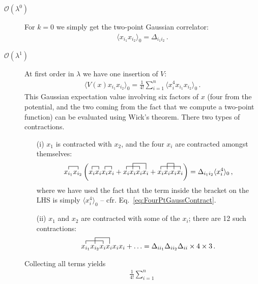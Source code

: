 \documentclass[notes.tex]{subfiles}
\begin{document}
\begin{description}
\item[$\mathcal{O}(\lambda^0)$] For $k=0$ we simply get the two-point Gaussian
  correlator: 
  \begin{align}
    \langle x_{i_1} x_{i_2} \rangle_0 = \Delta_{i_1 i_2}\, .
  \end{align}
\item[$\mathcal{O}(\lambda^1)$] At first order in $\lambda$ we have one insertion
  of $V$:
  \begin{align}
    \langle V(x) x_{i_1} x_{i_2} \rangle_0 = \frac{1}{4!} \sum_{i=1}^n
    \langle x_i^4 x_{i_1} x_{i_2} \rangle_0\, .
  \end{align}
  This Gaussian expectation value involving six factors of $x$ (four
  from the potential, and the two coming from the fact that we compute
  a two-point function) can be evaluated using Wick's
  theorem. There two types of contractions.
  \begin{itemize}
  \item [(i)] $x_1$ is contracted with $x_2$, and the four $x_i$ are
    contracted amongst themselves:
    \begin{align}
      \contraction{}{x_{i_1}}{}{x_{i_2}}
      x_{i_1} x_{i_2} 
      \left(
      \contraction{}{x_{i}}{}{x_{i}}
      \contraction{x_{i} x_{i}}{x_{i}}{}{x_{i}}
      x_{i} x_{i} x_{i} x_{i} +
      \contraction{}{x_{i}}{x_{i}}{x_{i}}
      \contraction[2ex]{x_{i}}{x_{i}}{ x_{i}}{x_{i}}
      x_{i} x_{i} x_{i} x_{i} +
      \contraction{}{x_{i}}{x_{i}x_{i}}{x_{i}}
      \contraction[2ex]{x_{i}}{x_{i}}{}{x_{i}}
      x_{i} x_{i} x_{i} x_{i} 
      \right) = \Delta_{i_1 i_2} \langle x_i^4\rangle_0
      \, ,
    \end{align}
    where we have used the fact that the term inside the bracket on
    the LHS is simply $\langle x_i^4\rangle_0$ --
    cfr. Eq.~\ref{eq:FourPtGaussContract}.
  \item [(ii)] $x_1$ and $x_2$ are contracted with some of the $x_i$;
    there are 12 such contractions:
    \begin{align}
      \contraction{}{x_{i_1}}{x_{i_2}}{x_{i}}
      \contraction[2ex]{x_{i_1}}{x_{i_2}}{x_{i}}{x_{i}}
      x_{i_1} x_{i_2}  x_{i} x_{i} x_{i} x_{i} + \ldots = 
      \Delta_{i i_1} \Delta_{i i_2} \Delta_{i i} \times 4
      \times 3\, .
    \end{align}
  \end{itemize}
  Collecting all terms yields
  \begin{align}
   \frac{1}{4!} \sum_{i=1}^n

\end{align}
\end{description}
\end{document}

